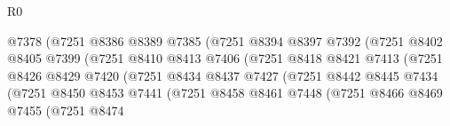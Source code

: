 \begin{lexlean}{R0}
\begin{coremodule}
                                      @7378
                                      (@7251
                                        @8386
                                        @8389
                                        @7385
                                        (@7251
                                          @8394
                                          @8397
                                          @7392
                                          (@7251
                                            @8402
                                            @8405
                                            @7399
                                            (@7251
                                              @8410
                                              @8413
                                              @7406
                                              (@7251
                                                @8418
                                                @8421
                                                @7413
                                                (@7251
                                                  @8426
                                                  @8429
                                                  @7420
                                                  (@7251
                                                    @8434
                                                    @8437
                                                    @7427
                                                    (@7251
                                                      @8442
                                                      @8445
                                                      @7434
                                                      (@7251
                                                        @8450
                                                        @8453
                                                        @7441
                                                        (@7251
                                                          @8458
                                                          @8461
                                                          @7448
                                                          (@7251
                                                            @8466
                                                            @8469
                                                            @7455
                                                            (@7251
                                                              @8474

\end{coremodule}
\end{lexlean}
